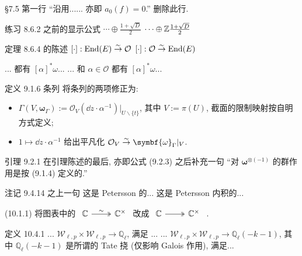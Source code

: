 \documentclass{AJerrata}
\newcommand{\bomega}{\symbf{\omega}}	%
\begin{document}
\begin{Errata}
		\item[\S 7.5 第一行 ``沿用...... 亦即 $a_0(f)=0$.'']
		删除此行.
		
		\item[练习 8.6.2 之前的显示公式]
		\Orig $\cdots \oplus \frac{1 + \sqrt{D}}{2}$
		\Corr $\cdots \oplus \mathbb{Z} \frac{1 + \sqrt{D}}{2}$
		
		\item[定理 8.6.4 的陈述]
		\Orig $[\cdot]: \operatorname{End}(E) \stackrel{\sim}{\rightarrow} \mathcal{O}$
		\Corr $[\cdot]: \mathcal{O} \stackrel{\sim}{\rightarrow} \operatorname{End}(E)$
		
		\Orig ... 都有 $[\alpha]^* \omega$...
		\Corr ... 和 $\alpha \in \mathcal{O}$ 都有 $[\alpha]^* \omega$...
		
		\item[定义 9.1.6 条列]
		将条列的两项修正为:
		\begin{itemize}
			\item $\Gamma(V, \bomega_\Gamma) := \mathcal{O}_V (\dd z \cdot \alpha^{-1}) |_{U \smallsetminus \{t\}}$, 其中 $V := \pi(U)$, 截面的限制映射按自明方式定义;
			\item $1 \mapsto \dd z \cdot \alpha^{-1}$ 给出平凡化 $\mathcal{O}_V \rightiso \bomega_\Gamma |_V$.
		\end{itemize}
		
		\item[引理 9.2.1]
		在引理陈述的最后, 亦即公式 (9.2.3) 之后补充一句 ``对 $\bomega^{\otimes (-1)}$ 的群作用是按 (9.1.4) 定义的.''

		\item[注记 9.4.14 之上一句]
		\Orig 这是 Petersson 的...
		\Corr 这是 Petersson 内积的...
		
		\item[(10.1.1)] 将图表中的
		$\begin{tikzcd} \mathbb{C} \arrow[twoheadrightarrow, r, "\sim"] & \mathbb{C}^\times \end{tikzcd}$
		改成
		$\begin{tikzcd} \mathbb{C} \arrow[twoheadrightarrow, r] & \mathbb{C}^\times \end{tikzcd}$ .

		\item[定义 10.4.1]
		\Orig ... $\mathcal{W}_{\ell, p} \times \mathcal{W}_{\ell, p} \to \mathbb{Q}_\ell$, 满足 ...
		\Corr ... $\mathcal{W}_{\ell, p} \times \mathcal{W}_{\ell, p} \to \mathbb{Q}_\ell(-k-1)$, 其中 $\mathbb{Q}_\ell(-k-1)$ 是所谓的 Tate 挠 (仅影响 Galois 作用), 满足...
		

\end{Errata}
\end{document}
